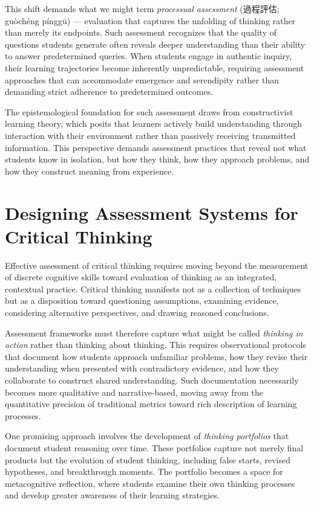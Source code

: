 \documentclass[
  Letterpaper,
]{scrbook}
\begin{document}
This shift demands what we might term \emph{processual assessment}
(過程評估; guòchéng pínggū) --- evaluation that captures the unfolding
of thinking rather than merely its endpoints. Such assessment recognizes
that the quality of questions students generate often reveals deeper
understanding than their ability to answer predetermined queries. When
students engage in authentic inquiry, their learning trajectories become
inherently unpredictable, requiring assessment approaches that can
accommodate emergence and serendipity rather than demanding strict
adherence to predetermined outcomes.

The epistemological foundation for such assessment draws from
constructivist learning theory, which posits that learners actively
build understanding through interaction with their environment rather
than passively receiving transmitted information. This perspective
demands assessment practices that reveal not what students know in
isolation, but how they think, how they approach problems, and how they
construct meaning from experience.

\section{Designing Assessment Systems for Critical
Thinking}\label{designing-assessment-systems-for-critical-thinking}

Effective assessment of critical thinking requires moving beyond the
measurement of discrete cognitive skills toward evaluation of thinking
as an integrated, contextual practice. Critical thinking manifests not
as a collection of techniques but as a disposition toward questioning
assumptions, examining evidence, considering alternative perspectives,
and drawing reasoned conclusions.

Assessment frameworks must therefore capture what might be called
\emph{thinking in action} rather than thinking about thinking. This
requires observational protocols that document how students approach
unfamiliar problems, how they revise their understanding when presented
with contradictory evidence, and how they collaborate to construct
shared understanding. Such documentation necessarily becomes more
qualitative and narrative-based, moving away from the quantitative
precision of traditional metrics toward rich description of learning
processes.

One promising approach involves the development of \emph{thinking
portfolios} that document student reasoning over time. These portfolios
capture not merely final products but the evolution of student thinking,
including false starts, revised hypotheses, and breakthrough moments.
The portfolio becomes a space for metacognitive reflection, where
students examine their own thinking processes and develop greater
awareness of their learning strategies.
\end{document}
